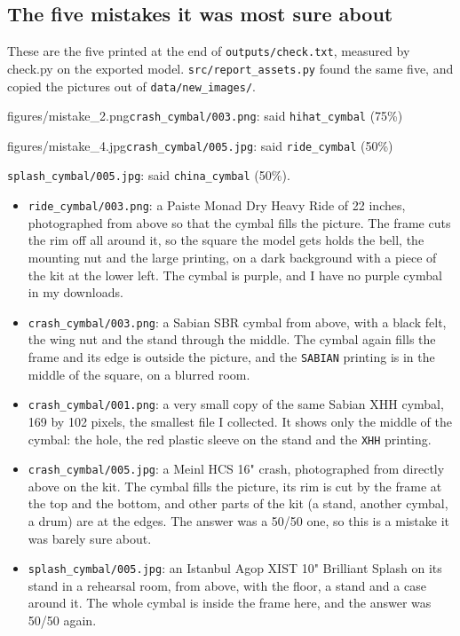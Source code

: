 \documentclass[11pt]{article}
\begin{document}
\subsection*{The five mistakes it was most sure about}

These are the five printed at the end of \texttt{outputs/check.txt}, measured by
check.py on the exported model. \texttt{src/report\_assets.py} found the same
five, and copied the pictures out of \texttt{data/new\_images/}.

{figures/mistake_2.png}{\texttt{crash\_cymbal/003.png}: said
\texttt{hihat\_cymbal} (75\%)}

{figures/mistake_4.jpg}{\texttt{crash\_cymbal/005.jpg}: said
\texttt{ride\_cymbal} (50\%)}

\begin{center}\end{center}

\texttt{splash\_cymbal/005.jpg}: said \texttt{china\_cymbal} (50\%).

\begin{itemize}
\item \texttt{ride\_cymbal/003.png}: a Paiste Monad Dry Heavy Ride of 22 inches,
photographed from above so that the cymbal fills the picture. The frame cuts
the rim off all around it, so the square the model gets holds the bell, the
mounting nut and the large printing, on a dark background with a piece of the
kit at the lower left. The cymbal is purple, and I have no purple cymbal in my
downloads.
\item \texttt{crash\_cymbal/003.png}: a Sabian SBR cymbal from above, with a
black felt, the wing nut and the stand through the middle. The cymbal again
fills the frame and its edge is outside the picture, and the \texttt{SABIAN}
printing is in the middle of the square, on a blurred room.
\item \texttt{crash\_cymbal/001.png}: a very small copy of the same Sabian XHH
cymbal, 169 by 102 pixels, the smallest file I collected. It shows only the
middle of the cymbal: the hole, the red plastic sleeve on the stand and the
\texttt{XHH} printing.
\item \texttt{crash\_cymbal/005.jpg}: a Meinl HCS 16" crash, photographed from
directly above on the kit. The cymbal fills the picture, its rim is cut by the
frame at the top and the bottom, and other parts of the kit (a stand, another
cymbal, a drum) are at the edges. The answer was a 50/50 one, so this is a
mistake it was barely sure about.
\item \texttt{splash\_cymbal/005.jpg}: an Istanbul Agop XIST 10" Brilliant
Splash on its stand in a rehearsal room, from above, with the floor, a stand
and a case around it. The whole cymbal is inside the frame here, and the answer
was 50/50 again.
\end{itemize}
\end{document}
